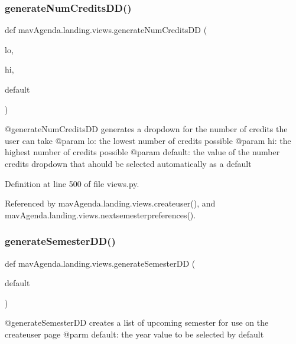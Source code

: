 \subsubsection{\texorpdfstring{generate\+Num\+Credits\+D\+D()}{generateNumCreditsDD()}}
{\footnotesize\ttfamily def mav\+Agenda.\+landing.\+views.\+generate\+Num\+Credits\+DD (\begin{DoxyParamCaption}\item[{}]{lo,  }\item[{}]{hi,  }\item[{}]{default }\end{DoxyParamCaption})}

\begin{DoxyVerb}@generateNumCreditsDD generates a dropdown for the number of credits the user can take
@param lo: the lowest number of credits possible
@param hi: the highest number of credits possible
@param default: the value of the number credits dropdown that ahould be selected automatically as a default
\end{DoxyVerb}
 

Definition at line 500 of file views.\+py.



Referenced by mav\+Agenda.\+landing.\+views.\+createuser(), and mav\+Agenda.\+landing.\+views.\+nextsemesterpreferences().

\mbox{\label{namespacemavAgenda_1_1landing_1_1views_a19301baffd56440f07e157f4304bcfa7}} 
\subsubsection{\texorpdfstring{generate\+Semester\+D\+D()}{generateSemesterDD()}}
{\footnotesize\ttfamily def mav\+Agenda.\+landing.\+views.\+generate\+Semester\+DD (\begin{DoxyParamCaption}\item[{}]{default }\end{DoxyParamCaption})}

\begin{DoxyVerb}@generateSemesterDD creates a list of upcoming semester for use on the createuser page
@parm default: the year value to be selected by default
\end{DoxyVerb}
 


